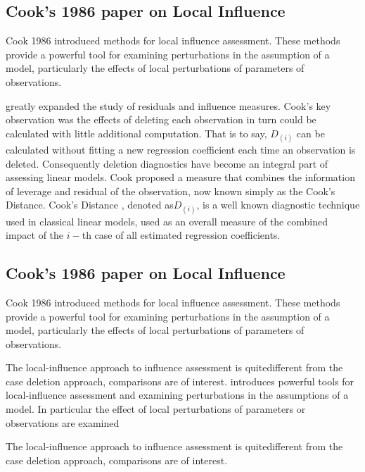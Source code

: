 \documentclass[Main.tex]{subfiles}
\begin{document}
\subsection{Cook's 1986 paper on Local Influence}%
Cook 1986 introduced methods for local influence assessment. These methods provide a powerful tool for examining perturbations in the assumption of a model, particularly the effects of local perturbations of parameters of observations.


\citet{cook77} greatly expanded the study of residuals and influence measures.  Cook's key observation was the effects of deleting each observation in turn could be calculated with little additional computation. That is to say, $D_{(i)}$ can be calculated without fitting a new regression coefficient each time an observation is deleted.  Consequently deletion diagnostics have become an integral part of assessing linear models. Cook proposed a measure that combines the information of leverage and residual of the observation, now known simply as the Cook's Distance. Cook's Distance , denoted as$D_{(i)}$, is a well known diagnostic technique used in classical linear models, used as an overall measure of the combined impact of the $i-$th case of all estimated regression coefficients.


\subsection{Cook's 1986 paper on Local Influence}%
Cook 1986 introduced methods for local influence assessment. These methods provide a powerful tool for examining perturbations in the assumption of a model, particularly the effects of local perturbations of parameters of observations.

The local-influence approach to influence assessment is quitedifferent from the case deletion approach, comparisons are of
interest.
	\citet{cook86} introduces powerful tools for local-influence assessment and examining perturbations in the assumptions of a model. In particular the effect of local perturbations of parameters or observations are examined	
	

	
	The local-influence approach to influence assessment is quitedifferent from the case deletion approach, comparisons are of
	interest.
	
\end{document}
